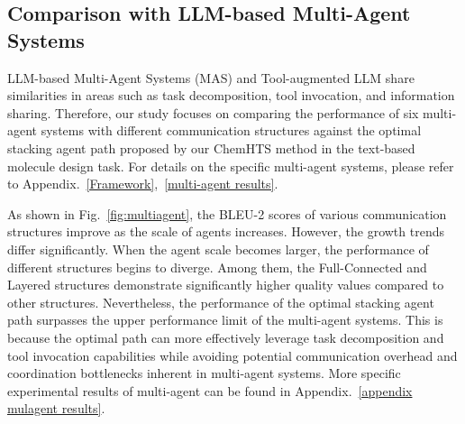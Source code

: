 \subsection{Comparison with LLM-based Multi-Agent Systems}
LLM-based Multi-Agent Systems (MAS) and Tool-augmented LLM share similarities in areas such as task decomposition, tool invocation, and information sharing. Therefore, our study focuses on comparing the performance of six multi-agent systems with different communication structures against the optimal stacking agent path proposed by our ChemHTS method in the text-based molecule design task. For details on the specific multi-agent systems, please refer to Appendix.~\ref{Framework},~\ref{multi-agent results}.

As shown in Fig.~\ref{fig:multiagent}, the BLEU-2 scores of various communication structures improve as the scale of agents increases. However, the growth trends differ significantly. When the agent scale becomes larger, the performance of different structures begins to diverge. Among them, the Full-Connected and Layered structures demonstrate significantly higher quality values compared to other structures. 
Nevertheless, the performance of the optimal stacking agent path surpasses the upper performance limit of the multi-agent systems. This is because the optimal path can more effectively leverage task decomposition and tool invocation capabilities while avoiding potential communication overhead and coordination bottlenecks inherent in multi-agent systems. 
More specific experimental results of multi-agent can be found in Appendix.~\ref{appendix mulagent results}.



